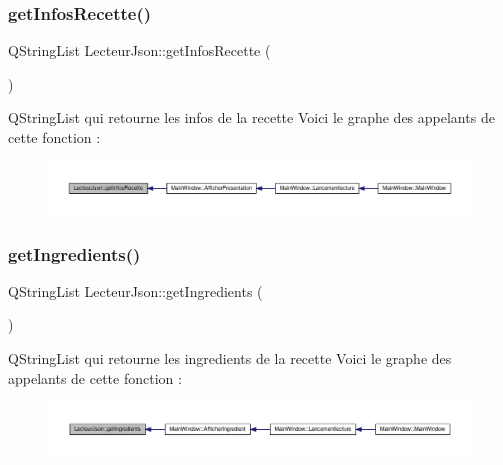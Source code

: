 \subsubsection{\texorpdfstring{get\+Infos\+Recette()}{getInfosRecette()}}
{\footnotesize\ttfamily Q\+String\+List Lecteur\+Json\+::get\+Infos\+Recette (\begin{DoxyParamCaption}{ }\end{DoxyParamCaption})\hspace{0.3cm}{\ttfamily [inline]}}

Q\+String\+List qui retourne les infos de la recette Voici le graphe des appelants de cette fonction \+:
\nopagebreak
\begin{figure}[H]
\begin{center}
\leavevmode
\includegraphics[width=350pt]{class_lecteur_json_a0c507870050e16de3688d310d1f3b65a_icgraph}
\end{center}
\end{figure}
\mbox{\label{class_lecteur_json_a0c18d502de54aea85b4d76f1b2858423}} 
\subsubsection{\texorpdfstring{get\+Ingredients()}{getIngredients()}}
{\footnotesize\ttfamily Q\+String\+List Lecteur\+Json\+::get\+Ingredients (\begin{DoxyParamCaption}{ }\end{DoxyParamCaption})\hspace{0.3cm}{\ttfamily [inline]}}

Q\+String\+List qui retourne les ingredients de la recette Voici le graphe des appelants de cette fonction \+:
\nopagebreak
\begin{figure}[H]
\begin{center}
\leavevmode
\includegraphics[width=350pt]{class_lecteur_json_a0c18d502de54aea85b4d76f1b2858423_icgraph}
\end{center}
\end{figure}
\mbox{\label{class_lecteur_json_a88d73523c1775a8c7001b5abae152740}} 
